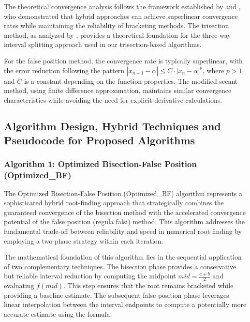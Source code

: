 \documentclass[amsmath, amssymb, aps]{revtex4-2}
\begin{document}
The theoretical convergence analysis follows the framework established by \cite{sabharwal2019blended} and \cite{badr2022novel}, who demonstrated that hybrid approaches can achieve superlinear convergence rates while maintaining the reliability of bracketing methods. The trisection method, as analyzed by \cite{demir2008trisection}, provides a theoretical foundation for the three-way interval splitting approach used in our trisection-based algorithms.

For the false position method, the convergence rate is typically superlinear, with the error reduction following the pattern $|x_{n+1} - \alpha| \leq C \cdot |x_n - \alpha|^p$, where $p > 1$ and $C$ is a constant depending on the function properties. The modified secant method, using finite difference approximation, maintains similar convergence characteristics while avoiding the need for explicit derivative calculations.

{ %
\titlespacing*{\subsubsection}{0pt}{0ex}{0.2ex} %
\subsection{Algorithm Design, Hybrid Techniques and Pseudocode for Proposed Algorithms}
\vspace{-1.2ex} %
\subsubsection{Algorithm 1: Optimized Bisection-False Position (Optimized\_BF)}
\vspace{-0.8ex} %
}
The Optimized Bisection-False Position (Optimized\_BF) algorithm represents a sophisticated hybrid root-finding approach that strategically combines the guaranteed convergence of the bisection method with the accelerated convergence potential of the false position (regula falsi) method. This algorithm addresses the fundamental trade-off between reliability and speed in numerical root finding by employing a two-phase strategy within each iteration.

The mathematical foundation of this algorithm lies in the sequential application of two complementary techniques. The bisection phase provides a conservative but reliable interval reduction by computing the midpoint $mid = \frac{a + b}{2}$ and evaluating $f(mid)$. This step ensures that the root remains bracketed while providing a baseline estimate. The subsequent false position phase leverages linear interpolation between the interval endpoints to compute a potentially more accurate estimate using the formula:
\end{document}
